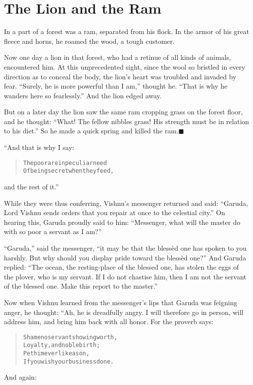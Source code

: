 \documentclass[article, twoside, 14pt]{memoir}
\newcommand{\qed}{\hfill \ensuremath{\blacksquare}}
\renewenvironment{verbatim}{%
\begin{quote}%
\vskip -10pt%
\begin{alltt}\normalfont\large}{\end{alltt}%
\end{quote}%
\vskip -10pt
} %
\begin{document}
\chapter{The Lion and the Ram}

\label{s23}

In a part of a forest was a ram, separated from his flock. In the
armor of his great fleece and horns, he roamed the wood, a tough
customer.

Now one day a lion in that forest, who had a retinue of all kinds
of animals, encountered him. At this unprecedented sight, since the
wool so bristled in every direction as to conceal the body, the
lion's heart was troubled and invaded by fear.
``Surely, he is more powerful than I am,'' thought he.
``That is why he wanders here so fearlessly.'' And the lion edged
away.

But on a later day the lion saw the same ram cropping grass on the
forest floor, and he thought:
``What! The fellow nibbles grass! His strength must be in relation to his diet.''
So he made a quick spring and killed the ram.\hyperref[s23]{\qed}

“And that is why I say:

\begin{verbatim}
The poor are in peculiar need
Of being secret when they feed,
\end{verbatim}
and the rest of it.”

While they were thus conferring, Vishnu's messenger returned and
said:
``Garuda, Lord Vishnu sends orders that you repair at once to the celestial city.''
On hearing this, Garuda proudly said to him:
``Messenger, what will the master do with so poor a servant as I am?''

``Garuda,'' said the messenger,
``it may be that the blessèd one has spoken to you harshly. But why should you display pride toward the blessèd one?''
And Garuda replied:
``The ocean, the resting-place of the blessed one, has stolen the eggs of the plover, who is my servant. If I do not chastise him, then I am not the servant of the blessed one. Make this report to the master.''

Now when Vishnu learned from the messenger's lips that Garuda was
feigning anger, he thought: “Ah, he is dreadfully angry. I will
therefore go in person, will address him, and bring him back with
all honor. For the proverb says:

\begin{verbatim}
Shame no servant showing worth,
Loyalty, and noble birth;
Pet him ever like a son,
If you wish your business done.
\end{verbatim}
And again:
\end{document}
